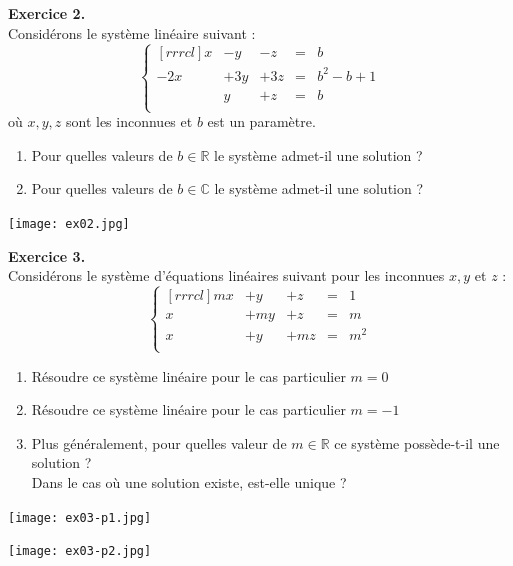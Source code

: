 \documentclass[a4paper, 10pt]{report}
\begin{document}
	\noindent
	\textbf{Exercice 2.}\\
	Considérons le système linéaire suivant :
	\[\left\{\begin{matrix}[rrrcl]
		x & -y & -z &=& b\\
		-2x & +3y & +3z &=& b^2 - b + 1\\
		& y & +z &=& b\\
	\end{matrix}\right.\]
	où $x, y, z$ sont les inconnues et $b$ est un paramètre.
	
	\begin{enumerate}[label=(\roman*)]
		\item Pour quelles valeurs de $b \in \mathbb{R}$ le système
		admet-il une solution ?
		\item Pour quelles valeurs de $b \in \mathbb{C}$ le système
		admet-il une solution ?
	\end{enumerate}
	
	\texttt{[image: ex02.jpg]}
	
	\newpage
	
	\noindent
	\textbf{Exercice 3.}\\
	Considérons le système d'équations linéaires suivant pour les
	inconnues $x, y$ et $z$ :
	\[\left\{\begin{matrix}[rrrcl]
		mx & +y & +z &=& 1\\
		x & +my & +z &=& m\\
		x & +y & +mz &=& m^2\\
	\end{matrix}\right.\]
	\begin{enumerate}[label=(\roman*)]
		\item Résoudre ce système linéaire pour le cas particulier $m = 0$
		\item Résoudre ce système linéaire pour le cas particulier $m = -1$
		\item Plus généralement, pour quelles valeur de $m \in \mathbb{R}$
		ce système possède-t-il une solution ?\\
		Dans le cas où une solution existe, est-elle unique ?
	\end{enumerate}
	
	\colorbox{solution}
	{\begin{minipage}{0.9\textwidth}
		
	\end{minipage}}
	
	\texttt{[image: ex03-p1.jpg]}
	
	\texttt{[image: ex03-p2.jpg]}
	
\end{document}
